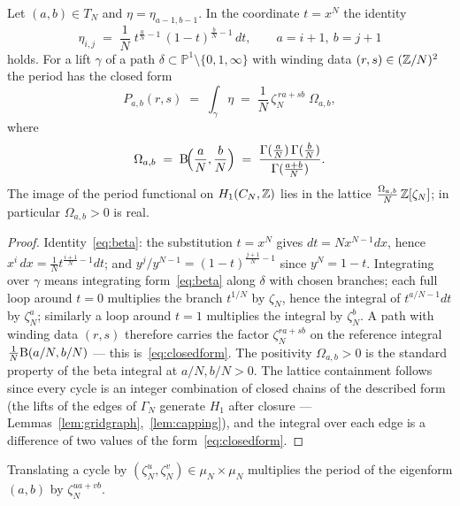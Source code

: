 \begin{lemma}\label{lem:closedform}
Let $(a,b)\in T_N$ and $\eta=\eta_{a-1,b-1}$. In the coordinate
$t=x^N$ the identity
\begin{equation}\label{eq:beta}
  \eta_{i,j} \;=\; \frac{1}{N}\;
  t^{\frac{a}{N}-1}\,(1-t)^{\frac{b}{N}-1}\,dt,
  \qquad a=i+1,\ b=j+1
\end{equation}
holds. For a lift $\gamma$ of a path
$\delta\subset\mathbb{P}^1\setminus\{0,1,\infty\}$ with winding data
$(r,s)\in(\mathbb{Z}/N)^2$ the period has the closed form
\begin{equation}\label{eq:closedform}
  P_{a,b}(r,s) \;=\; \int_\gamma \eta
  \;=\; \frac{1}{N}\,\zeta_N^{\,ra+sb}\;\Omega_{a,b},
\end{equation}
where
\begin{equation}\label{eq:omegaab}
  \Omega_{a,b}\;=\;\mathrm{B}\!\Bigl(\frac{a}{N},\frac{b}{N}\Bigr)
  \;=\;\frac{\Gamma(\frac{a}{N})\,\Gamma(\frac{b}{N})}{\Gamma(\frac{a+b}{N})}.
\end{equation}
The image of the period functional on $H_1(C_N,\mathbb{Z})$ lies in the
lattice $\frac{\Omega_{a,b}}{N}\,\mathbb{Z}[\zeta_N]$; in particular
$\Omega_{a,b}>0$ is real.
\end{lemma}

\begin{proof}
Identity~\eqref{eq:beta}: the substitution $t=x^N$ gives
$dt=Nx^{N-1}dx$, hence $x^i\,dx=\tfrac1N t^{\frac{i+1}{N}-1}dt$;
and $y^j/y^{N-1}=(1-t)^{\frac{j+1}{N}-1}$ since $y^N=1-t$.
Integrating over $\gamma$ means integrating form~\eqref{eq:beta}
along $\delta$ with chosen branches; each full loop around $t=0$
multiplies the branch $t^{1/N}$ by $\zeta_N$, hence the integral of
$t^{a/N-1}dt$ by $\zeta_N^{a}$; similarly a loop around $t=1$
multiplies the integral by $\zeta_N^{b}$. A path with winding data
$(r,s)$ therefore carries the factor $\zeta_N^{ra+sb}$ on the
reference integral
$\frac1N\mathrm{B}(a/N,b/N)$ --- this is~\eqref{eq:closedform}. The
positivity $\Omega_{a,b}>0$ is the standard property of the beta
integral at $a/N,b/N>0$. The lattice containment follows since every
cycle is an integer combination of closed chains of the described
form (the lifts of the edges of $\Gamma_N$ generate $H_1$ after
closure --- Lemmas~\ref{lem:gridgraph},~\ref{lem:capping}), and the
integral over each edge is a difference of two values of the
form~\eqref{eq:closedform}.
\end{proof}

\begin{corollary}\label{cor:equivar}
Translating a cycle by $(\zeta_N^u,\zeta_N^v)\in\mu_N\times\mu_N$
multiplies the period of the eigenform $(a,b)$ by $\zeta_N^{ua+vb}$.
\end{corollary}


